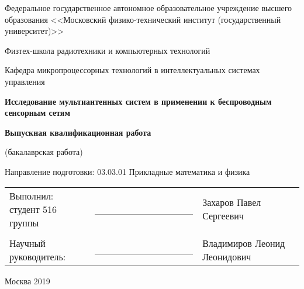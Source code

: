 \begin{titlepage}
\thispagestyle{empty}

{\centering
Федеральное государственное автономное образовательное учреждение высшего образования 
<<Московский физико{}-технический институт (государственный университет)>>\par}

\bigskip
{\centering
Физтех-школа радиотехники и компьютерных технологий \par}

\bigskip
{\centering 
Кафедра микропроцессорных технологий в интеллектуальных системах управления
\par}


\bigskip

\bigskip


\vfill

{\centering\Large\bfseries
\textbf{Исследование мультиантенных систем в применении к беспроводным сенсорным сетям}
\par}

\bigskip

{\centering\bfseries
Выпускная квалификационная работа

(бакалаврская работа)

\bigskip
Направление подготовки: 03.03.01 Прикладные математика и физика
\par}

\vfill

\begin{tabular}{lll}\\
\specialcell{Выполнил:\\студент 516 группы}  & ______________ & Захаров Павел Сергеевич \\
                     &                &                  \\
Научный руководитель: & ______________ & Владимиров Леонид Леонидович \\
\end{tabular}

\vfill

{\centering
Москва 
2019
\par}

\end{titlepage}
